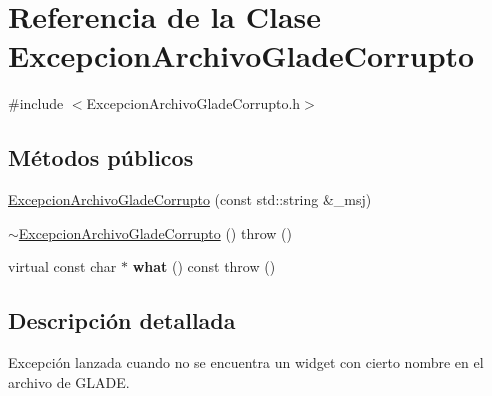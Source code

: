\hypertarget{classExcepcionArchivoGladeCorrupto}{\section{\-Referencia de la \-Clase \-Excepcion\-Archivo\-Glade\-Corrupto}
\label{classExcepcionArchivoGladeCorrupto}
}


{\ttfamily \#include $<$\-Excepcion\-Archivo\-Glade\-Corrupto.\-h$>$}

\subsection*{\-Métodos públicos}
\begin{DoxyCompactItemize}
\item 
\hyperlink{classExcepcionArchivoGladeCorrupto_a9732a4d8b31b19b66326b3efc6a40c71}{\-Excepcion\-Archivo\-Glade\-Corrupto} (const std\-::string \&\-\_\-msj)
\item 
\hyperlink{classExcepcionArchivoGladeCorrupto_ae2170588abaf5ecf4b45fbeb7d62846b}{$\sim$\-Excepcion\-Archivo\-Glade\-Corrupto} ()  throw ()
\item 
\hypertarget{classExcepcionArchivoGladeCorrupto_a612f07ac6718f68498c1ea356b2f26ba}{virtual const char $\ast$ {\bfseries what} () const   throw ()}\label{classExcepcionArchivoGladeCorrupto_a612f07ac6718f68498c1ea356b2f26ba}

\end{DoxyCompactItemize}


\subsection{\-Descripción detallada}
\-Excepción lanzada cuando no se encuentra un widget con cierto nombre en el archivo de \-G\-L\-A\-D\-E. 

